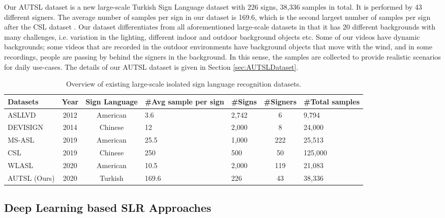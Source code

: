 \documentclass[11pt, a4paper, singlecolumn]{article}
\begin{document}
Our AUTSL dataset is a new large-scale Turkish Sign Language dataset with 226 signs, 38,336 samples in total. It is performed by 43 different signers. The average number of samples per sign in our dataset is 169.6, which is the second largest number of samples per sign after the CSL dataset \cite{huang2018attention}. Our dataset differentiates from all aforementioned large-scale datasets in that it has 20 different backgrounds with many challenges, i.e. variation in the lighting, different indoor and outdoor background objects etc. Some of our videos have dynamic backgrounds; some videos that are recorded in the outdoor environments have background objects that move with the wind, and in some recordings, people are passing by behind the signers in the background. In this sense, the samples are collected to provide realistic scenarios for daily use-cases. The details of our AUTSL dataset is given in Section \ref{sec:AUTSLDataset}.
 
\begin{table}[t]
	\caption{Overview of existing large-scale isolated sign language recognition datasets.}
	\centering
	\label{table1}
		\begin{tabular}{ lccp{2cm}lcp{1.7cm} }
			\hline
			\textbf{Datasets} & \textbf{Year} & \textbf{Sign Language}  & \textbf{\centering \#Avg sample per sign} & \textbf{\#Signs}  & \textbf{\#Signers}  & \textbf{\#Total samples} \\ \hline
			ASLLVD \cite{neidle2012challenges}      & 2012 & American & 3.6 & 2,742 & 6 & 9,794   \\ 
			DEVISIGN \cite{chai2015devisign}    & 2014 & Chinese & 12 & 2,000 & 8 & 24,000   \\ 
			MS-ASL \cite{joze2018ms}   & 2019 & American & 25.5 & 1,000 & 222 & 25,513  \\ 
			CSL \cite{huang2018attention}     	& 2019 & Chinese & 250 & 500 & 50 & 125,000 \\ 
			WLASL \cite{li2020word}       & 2020 & American & 10.5 & 2,000 & 119 & 21,083   \\ 
			AUTSL (Ours) & 2020 & Turkish &  169.6 & 226 & 43 & 38,336  \\ \hline
			
		\end{tabular}
\end{table}

\subsection{Deep Learning based SLR Approaches}
\label{sec:SRLApproaches}
\end{document}
